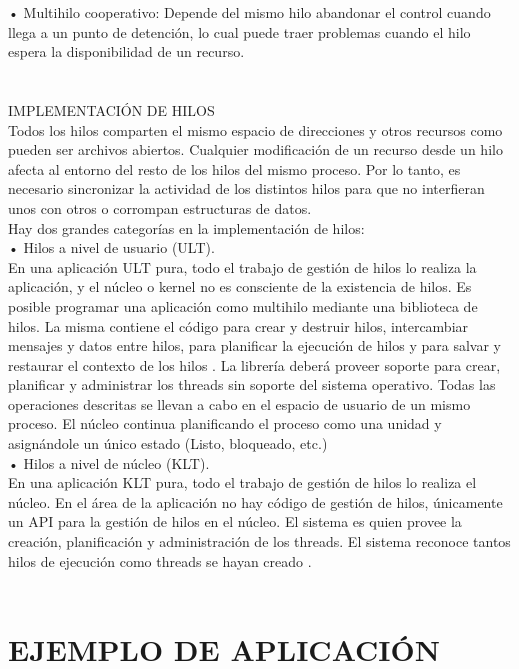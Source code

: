 \documentclass[conference]{IEEEtran}
\begin{document}
• Multihilo cooperativo: Depende del mismo hilo abandonar el control cuando llega a un punto de detención, lo cual puede traer problemas cuando el hilo espera la disponibilidad de un recurso.
\\
\\
\\
IMPLEMENTACIÓN DE HILOS
\\
Todos los hilos comparten el mismo espacio de direcciones y otros recursos como pueden ser archivos abiertos. Cualquier modificación de un recurso desde un hilo afecta al entorno del resto de los hilos del mismo proceso. Por lo tanto, es necesario sincronizar la actividad de los distintos hilos para que no interfieran unos con otros o corrompan estructuras de datos.
\\
Hay dos grandes categorías en la implementación de hilos:
\\
•	Hilos a nivel de usuario (ULT).
\\
En una aplicación ULT pura, todo el trabajo de gestión de hilos lo realiza la aplicación, y el núcleo o kernel no es consciente de la existencia de hilos. Es posible programar una aplicación como multihilo mediante una biblioteca de hilos. La misma contiene el código para crear y destruir hilos, intercambiar mensajes y datos entre hilos, para planificar la ejecución de hilos y para salvar y restaurar el contexto de los hilos \cite{b4}. La librería deberá proveer soporte para crear, planificar y administrar los threads sin soporte del sistema operativo. 
Todas las operaciones descritas se llevan a cabo en el espacio de usuario de un mismo proceso. El núcleo continua planificando el proceso como una unidad y asignándole un único estado (Listo, bloqueado, etc.)
\\
•	Hilos a nivel de núcleo (KLT).
\\
En una aplicación KLT pura, todo el trabajo de gestión de hilos lo realiza el núcleo. En el área de la aplicación no hay código de gestión de hilos, únicamente un API para la gestión de hilos en el núcleo. El sistema es quien provee la creación, planificación y administración de los threads. El sistema reconoce tantos hilos de ejecución como threads se hayan creado \cite{b5}.
\\
\\
\section{EJEMPLO DE APLICACIÓN}
\\
\\
\end{document}
